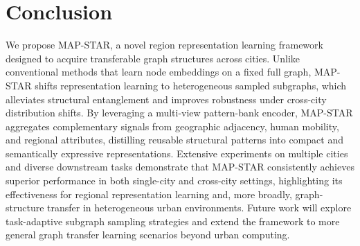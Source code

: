 \section{Conclusion}

We propose MAP-STAR, a novel region representation learning framework designed to acquire transferable graph structures across cities. Unlike conventional methods that learn node embeddings on a fixed full graph, MAP-STAR shifts representation learning to heterogeneous sampled subgraphs, which alleviates structural entanglement and improves robustness under cross-city distribution shifts. By leveraging a multi-view pattern-bank encoder, MAP-STAR aggregates complementary signals from geographic adjacency, human mobility, and regional attributes, distilling reusable structural patterns into compact and semantically expressive representations. Extensive experiments on multiple cities and diverse downstream tasks demonstrate that MAP-STAR consistently achieves superior performance in both single-city and cross-city settings, highlighting its effectiveness for regional representation learning and, more broadly, graph-structure transfer in heterogeneous urban environments. Future work will explore task-adaptive subgraph sampling strategies and extend the framework to more general graph transfer learning scenarios beyond urban computing.


